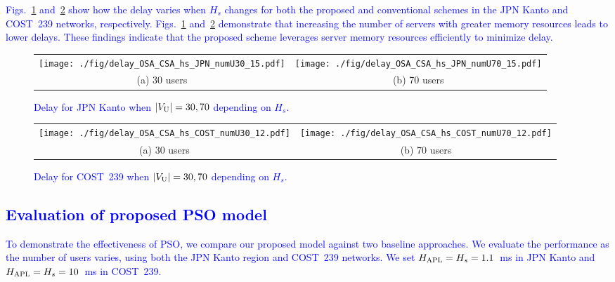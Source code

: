 \documentclass[10pt, letterpaper]{IEEEtran}
\newcommand\blue[1]{\textcolor{blue}{#1}}
\begin{document}
\begin{CJK}{UTF8}{ipxm}
\blue{
Figs.~\ref{fig:delay_OSA_CSA_hs_JPN} and~\ref{fig:delay_OSA_CSA_hs_COST} show how the delay varies when $H_s$ changes for both the proposed and conventional schemes in the JPN Kanto and COST~239 networks, respectively.
Figs.~\ref{fig:delay_OSA_CSA_hs_JPN} and~\ref{fig:delay_OSA_CSA_hs_COST} demonstrate that increasing the number of servers with greater memory resources leads to lower delays. 
These findings indicate that the proposed scheme leverages server memory resources efficiently to minimize delay.
}
\begin{figure}[t]
  \begin{center}
      \begin{tabular}{cc}
      \texttt{[image: ./fig/delay\_OSA\_CSA\_hs\_JPN\_numU30\_15.pdf]} &
      \texttt{[image: ./fig/delay\_OSA\_CSA\_hs\_JPN\_numU70\_15.pdf]} \\
      (a) 30 users & (b) 70 users
      \end{tabular}
  \end{center}
  \caption{\blue{Delay for JPN Kanto when $|V_{\rm U}| = 30, 70$ depending on $H_s$.}}
  \label{fig:delay_OSA_CSA_hs_JPN}
\end{figure}
\begin{figure}[t]
  \begin{center}
      \begin{tabular}{cc}
      \texttt{[image: ./fig/delay\_OSA\_CSA\_hs\_COST\_numU30\_12.pdf]} &
      \texttt{[image: ./fig/delay\_OSA\_CSA\_hs\_COST\_numU70\_12.pdf]} \\
      (a) 30 users & (b) 70 users
      \end{tabular}
  \end{center}
  \caption{\blue{Delay for COST~239 when $|V_{\rm U}| = 30, 70$ depending on $H_s$.}}
  \label{fig:delay_OSA_CSA_hs_COST}
\end{figure}

\subsection{\blue{Evaluation of proposed PSO model}}
\blue{
To demonstrate the effectiveness of PSO, we compare our proposed model against two baseline approaches.
We evaluate the performance as the number of users varies, using both the JPN Kanto region and COST~239 networks.
We set $H_{\rm APL} = H_s = 1.1$~ms in JPN Kanto and $H_{\rm APL} = H_s = 10$~ms in COST~239.
}


\end{CJK}
\end{document}
